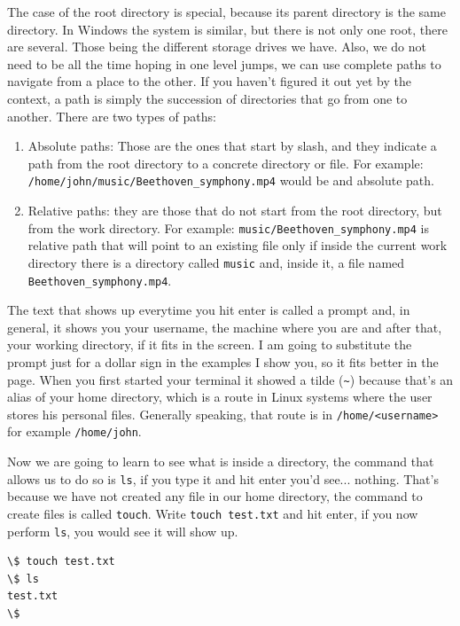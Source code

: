 \documentclass[a4paper]{article}
\begin{document}
The case of the root
directory is special, because its parent directory is the same directory. In
Windows the system is similar, but there is not only one root, there are
several. Those being the different storage drives we have. Also, we do not need
to be all the time hoping in one level jumps, we can use complete paths to
navigate from a place to the other. If you haven't figured it out yet by the
context, a path is simply the succession of directories that go from one to
another. There are two types of paths:
\begin{enumerate}
    \item Absolute paths: Those are the ones that start by slash, and they
    indicate a path from the root directory to a concrete directory or file.
    For example: \verb!/home/john/music/Beethoven_symphony.mp4! would be and
    absolute path.
    \item Relative paths: they are those that do not start from the root
    directory, but from the work directory. For example:
    \verb!music/Beethoven_symphony.mp4! is relative path that will point to
    an existing file only if inside the current work directory there is a
    directory called \verb!music! and, inside it, a file named
    \verb!Beethoven_symphony.mp4!.
\end{enumerate}

The text that shows up everytime you hit enter is called a prompt and, in
general, it shows you your username, the machine where you are and after that,
your working directory, if it fits in the screen. I am going to substitute
the prompt just for a dollar sign in the examples I show you, so it fits better
in the page. When you first started your terminal it showed a tilde (\verb!~!)
because that's an alias of your home directory, which is a route in Linux
systems where the user stores his personal files. Generally speaking, that
route is in \verb!/home/<username>! for example \verb!/home/john!.

Now we are going to learn to see what is inside a directory, the command that
allows us to do so is \verb!ls!, if you type it and hit enter you'd see...
nothing. That's because we have not created any file in our home directory,
the command to create files is called \verb"touch". Write \verb!touch test.txt!
and hit enter, if you now perform \verb!ls!, you would see it will show up.

\noindent
\begin{minipage}[H]{\linewidth}
\mbox{}
\begin{lstlisting}[style=terminalStyle]
\$ touch test.txt
\$ ls
test.txt
\$
\end{lstlisting}
\end{minipage}
\end{document}
